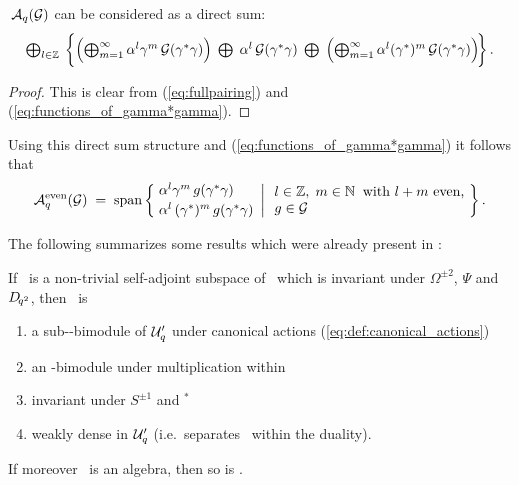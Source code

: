 \begin{lemma} \label{lem:AqG:direct_sum}
$\:{\mathcal A}_q(\mathcal G)$ can be considered as a direct sum:
$$ \textstyle \bigoplus_{l\in\ZZ}\:
  \left\{ \left( \bigoplus_{m=1}^\infty
     \alpha^l \gamma^m \,\calG(\gamma^*\gamma) \vertL \right)
            \;\bigoplus\;
  \alpha^l \,\calG(\gamma^*\gamma)
           \;\bigoplus\;
  \left(  \bigoplus_{m=1}^\infty  \alpha^l (\gamma^*)^m \,\calG(\gamma^*\gamma)
            \vertL \right)\!\!  \vertXL\right\}. $$
\end{lemma}
\begin{proof}
This is clear from (\ref{eq:fullpairing}) and (\ref{eq:functions_of_gamma*gamma}).
\end{proof}



\begin{cor} \label{cor:Aqeven:description} \rm
Using this direct sum structure and (\ref{eq:functions_of_gamma*gamma}) it follows that
$$\Aqeven(\calG)
   \;=\; \mbox{\rm span}\left\{ \!\! \left.\begin{array}{l}
            \alpha^l \gamma^m \,g(\gamma^*\gamma)   \\ \vertL
            \alpha^l \,(\gamma^*)^m \,g(\gamma^*\gamma)
            \end{array}
            \right| \begin{array}{l}
            l\in\ZZ, \; m\in\NN\: \mbox{ \rm with $l+m$ even,}  \\
            g\in\calG  \end{array}  \! \right\}.  $$
\end{cor}



The following summarizes some results which were already present in
\cite{Koelink:thesis,Koelink:QE2}:

\begin{prop} \label{prop:AqG}
If\/ \calG\ is a non-trivial self-adjoint subspace of\/ \HC\
which is invariant under\/ $\Omega^{\pm 2}$, $\Psi$ and\/ $D_{\!q^2}$,
then\/ \AqG\ is
 \begin{enumerate}
   \item a sub-\Uq-bimodule of\/ ${\mathcal U}_q'$ under canonical actions (\ref{eq:def:canonical_actions})
   \item an\/ \Aq-bimodule under multiplication within\/ \Aqext
   \item invariant under\/ $S^{\pm 1}$ and $^*$
   \item weakly dense in\/ ${\mathcal U}_q'$ (i.e.\ separates\/ \Uq\ within the duality).
 \end{enumerate}
If moreover\/ \calG\ is an algebra, then so is\/ \AqG.
\end{prop}

